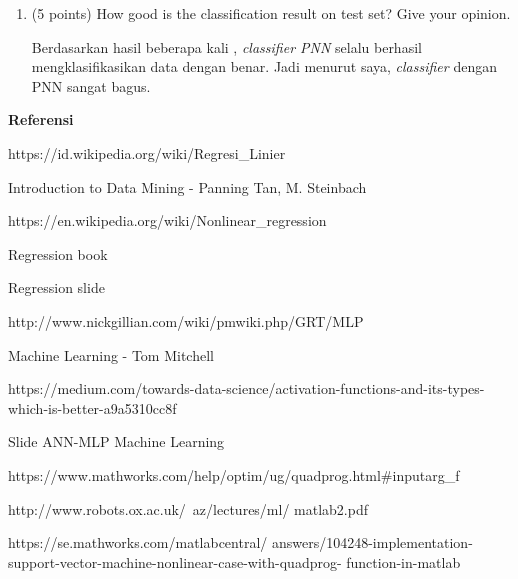 \documentclass[12pt]{article}%
\begin{document}
\begin{enumerate}
\begin{enumerate}
		\item (5 points) How good is the classification result on test set? Give your opinion.
		\par Berdasarkan hasil beberapa kali , \textit{classifier PNN} selalu berhasil mengklasifikasikan data dengan benar. Jadi menurut saya, \textit{classifier} dengan PNN sangat bagus.
 
	\end{enumerate}
	


\end{enumerate}

\par \textbf{Referensi}
\par [1] https://id.wikipedia.org/wiki/Regresi\_Linier
\par [2] Introduction to Data Mining - Panning Tan, M. Steinbach
\par [3] https://en.wikipedia.org/wiki/Nonlinear\_regression
\par [4] Regression book
\par [5] Regression slide
\par [6] http://www.nickgillian.com/wiki/pmwiki.php/GRT/MLP
\par [7] Machine Learning - Tom Mitchell
\par [8] https://medium.com/towards-data-science/activation-functions-and-its-types-which-is-better-a9a5310cc8f
\par [9] Slide ANN-MLP Machine Learning
\par [10] https://www.mathworks.com/help/optim/ug/quadprog.html#inputarg\_f
\par [11] http://www.robots.ox.ac.uk/~az/lectures/ml/ matlab2.pdf
\par [12] https://se.mathworks.com/matlabcentral/ answers/104248-implementation-support-vector-machine-nonlinear-case-with-quadprog- function-in-matlab
\end{document}
